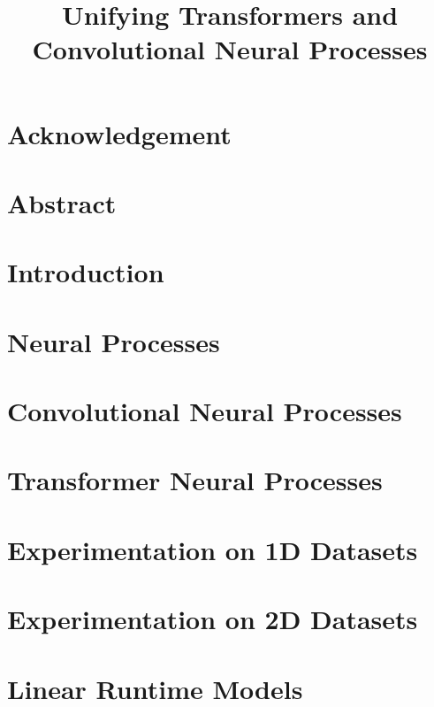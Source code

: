 \documentclass[12pt]{report}
\newcommand{\lrtitle}{
	Unifying Transformers and Convolutional Neural Processes
}
\begin{document}


\title{\textbf{\fontsize{24.88}{12}\selectfont \lrtitle}}
\author{{\LARGE \name}}

\reporttitlepage

\chapter*{Acknowledgement}

\newpage
\chapter*{Abstract}




\chapter{Introduction}


\chapter{Neural Processes}


\chapter{Convolutional Neural Processes}


\chapter{Transformer Neural Processes}



\chapter{Experimentation on 1D Datasets}


\chapter{Experimentation on 2D Datasets}


\chapter{Linear Runtime Models}

\end{document}
